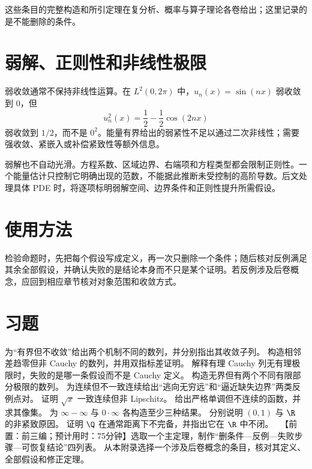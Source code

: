 这些条目的完整构造和所引定理在复分析、概率与算子理论各卷给出；这里记录的是不能删除的条件。

\section{弱解、正则性和非线性极限}

弱收敛通常不保持非线性运算。在 \(L^2(0,2\pi)\) 中，\(u_n(x)=\sin(nx)\) 弱收敛到 \(0\)，但
\[
 u_n^2(x)=\frac12-\frac12\cos(2nx)
\]
弱收敛到 \(1/2\)，而不是 \(0^2\)。能量有界给出的弱紧性不足以通过二次非线性；需要强收敛、紧嵌入或补偿紧致性等额外信息。

弱解也不自动光滑。方程系数、区域边界、右端项和方程类型都会限制正则性。一个能量估计只控制它明确出现的范数，不能据此推断未受控制的高阶导数。后文处理具体 PDE 时，将逐项标明弱解空间、边界条件和正则性提升所需假设。

\section*{使用方法}

检验命题时，先把每个假设写成定义，再一次只删除一个条件；随后核对反例满足其余全部假设，并确认失败的是结论本身而不只是某个证明。若反例涉及后卷概念，应回到相应章节核对对象范围和收敛方式。

\section*{习题}

\begin{enumerate}[label=\textbf{D.\arabic*.}]
  为“有界但不收敛”给出两个机制不同的数列，并分别指出其收敛子列。
  构造相邻差趋零但非 Cauchy 的数列，并用双指标差证明。
  解释有理 Cauchy 列无有理极限时，失败的是哪一条假设而不是 Cauchy 定义。
  构造无界但有两个不同有限部分极限的数列。
  为连续但不一致连续给出“逃向无穷远”和“逼近缺失边界”两类反例点对。
  证明 \(\sqrt x\) 一致连续但非 Lipschitz。
  给出严格单调但不连续的函数，并求其像集。
  为 \(\infty-\infty\) 与 \(0\cdot\infty\) 各构造至少三种结果。
  分别说明 \((0,1)\) 与 \(\R\) 的非紧致原因。
  证明 \(\Q\) 在通常距离下不完备，并指出它在 \(\R\) 中不闭。
  \ 【前置：前三编；预计用时：75分钟】选取一个主定理，制作“删条件—反例—失败步骤—可恢复结论”四列表。
  从本附录选择一个涉及后卷概念的条目，核对其定义、全部假设和修正定理。
\end{enumerate}
